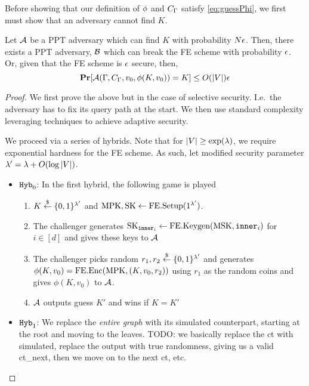 Before showing that our definition of $\phi$ and $C_\Gamma$ satisfy \cref{eq:guessPhi}, we first must show that an adversary cannot find $K$.
\begin{lemma}
	\label{lem:findK}
	Let $\mathcal{A}$ be a PPT adversary which can find $K$ with probability $N\epsilon$.
	Then, there exists a PPT adversary, $\mathcal{B}$ which can break the FE scheme with probability $\epsilon$.	
	Or, given that the FE scheme is $\epsilon$ secure, then,
	\begin{equation*}
		\operatorname*{\mathbf{Pr}}[\mathcal{A}(\Gamma, C_\Gamma, v_0, \phi(K, v_0)) = K] \leq O(|V|)\epsilon
	\end{equation*}
	\begin{proof}
		We first prove the above but in the case of selective security. I.e.\ the adversary has to fix
		its query path at the start.
		We then use standard complexity leveraging techniques to achieve adaptive security.

		We proceed via a series of hybrids. Note that for $|V| \geq \exp(\lambda)$, we require exponential hardness for the FE scheme.
		As such, let modified security parameter $\lambda' = \lambda + O(\log |V|)$.
		\begin{itemize}
			\item $\texttt{Hyb}_0$: In the first hybrid, the following game is played
				\begin{enumerate}
					\item $K \overset{\$}{\gets} \{0,1\}^{\lambda'}$ and $\text{MPK}, \text{SK} \gets \text{FE.Setup}(1^{\lambda'})$.
					\item The challenger generates $\text{SK}_{\texttt{inner}_i} \gets \text{FE.Keygen}(\text{MSK}, \texttt{inner}_i)$ for $i \in [d]$ and gives these keys to $\mathcal{A}$
					\item The challenger picks random $r_1, r_2 \overset{\$}{\gets} \{0,1\}^{\lambda'}$ and generates $\phi(K, v_0) = \text{FE.Enc}(\text{MPK}, (K, v_0, r_2))$ using $r_1$ as the random coins and gives $\phi(K, v_0)$ to $\mathcal{A}$.
					\item $\mathcal{A}$ outputs guess $K'$ and wins if $K = K'$
				\end{enumerate}
			\item $\texttt{Hyb}_1$: We replace the \emph{entire graph} with its simulated counterpart,
			starting at the root and moving to the leaves.
			TODO: we basically replace the ct with simulated, replace the output with true randomness,
			giving us a valid ct\_next, then we move on to the next ct, etc.


\end{itemize}
\end{proof}
\end{lemma}
